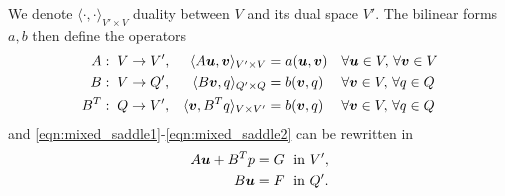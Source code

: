 %
We denote $\langle \cdot, \cdot \rangle_{V'\times V}$ duality between $V$ and its dual space $V'$.
The bilinear forms $a,b$ then define the operators
\begin{equation}
\begin{aligned}
A:\;\;&   V \rightarrow V', & \langle A\mathbf{\boldsymbol{u}},\mathbf{\boldsymbol{v}} \rangle_{V'\times V} =&\; a(\mathbf{\boldsymbol{u}},\mathbf{\boldsymbol{v}}) && \forall \mathbf{\boldsymbol{u}} \in V,\, \forall \mathbf{\boldsymbol{v}} \in V\\ 
B:\;\;&   V \rightarrow Q', & \langle B \mathbf{\boldsymbol{v}},q    \rangle_{Q'\times Q} =&\; b(\mathbf{\boldsymbol{v}},q)     && \forall \mathbf{\boldsymbol{v}}\in V,\, \forall q \in Q\\
B^T:\;\;& Q \rightarrow V', & \langle \mathbf{\boldsymbol{v}}, B^T q \rangle_{V\times V'} =&\; b(\mathbf{\boldsymbol{v}},q)     && \forall \mathbf{\boldsymbol{v}}\in V,\, \forall q \in Q
\end{aligned}
\end{equation}
and \eqref{eqn:mixed_saddle1}-\eqref{eqn:mixed_saddle2} can be rewritten in
\begin{subequations}
\begin{align}
 A\mathbf{\boldsymbol{u}} + B^Tp &= G \;\textrm{  in } V', \label{eqn:mixed_saddle_operator1} \\
 B\mathbf{\boldsymbol{u}} &= F  \;\textrm{  in } Q'. \label{eqn:mixed_saddle_operator2}
\end{align}
\end{subequations}

